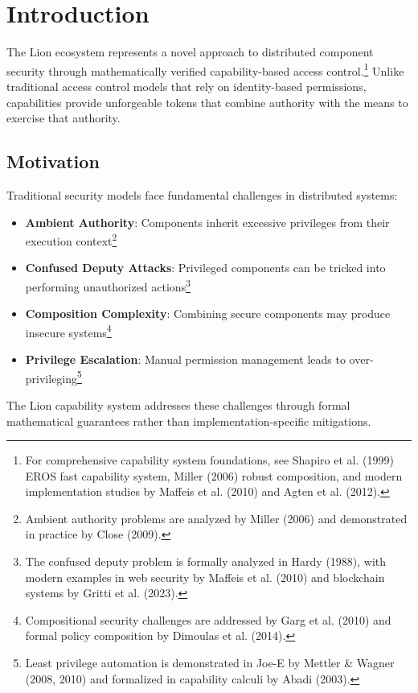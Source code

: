\tableofcontents

\newpage

\section{Introduction}

The Lion ecosystem represents a novel approach to distributed component security through mathematically verified capability-based access control.\footnote{For comprehensive capability system foundations, see Shapiro et al. (1999) EROS fast capability system, Miller (2006) robust composition, and modern implementation studies by Maffeis et al. (2010) and Agten et al. (2012).} Unlike traditional access control models that rely on identity-based permissions, capabilities provide unforgeable tokens that combine authority with the means to exercise that authority.

\subsection{Motivation}

Traditional security models face fundamental challenges in distributed systems:

\begin{itemize}
\item \textbf{Ambient Authority}: Components inherit excessive privileges from their execution context\footnote{Ambient authority problems are analyzed by Miller (2006) and demonstrated in practice by Close (2009).}
\item \textbf{Confused Deputy Attacks}: Privileged components can be tricked into performing unauthorized actions\footnote{The confused deputy problem is formally analyzed in Hardy (1988), with modern examples in web security by Maffeis et al. (2010) and blockchain systems by Gritti et al. (2023).}
\item \textbf{Composition Complexity}: Combining secure components may produce insecure systems\footnote{Compositional security challenges are addressed by Garg et al. (2010) and formal policy composition by Dimoulas et al. (2014).}
\item \textbf{Privilege Escalation}: Manual permission management leads to over-privileging\footnote{Least privilege automation is demonstrated in Joe-E by Mettler \& Wagner (2008, 2010) and formalized in capability calculi by Abadi (2003).}
\end{itemize}

The Lion capability system addresses these challenges through formal mathematical guarantees rather than implementation-specific mitigations.

